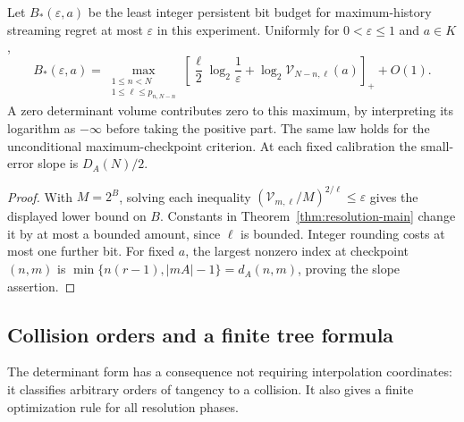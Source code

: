 \begin{corollary}\label{cor:intrinsic-bits}
Let $B_*(\varepsilon,a)$ be the least integer persistent bit budget
for maximum-history streaming regret at most $\varepsilon$ in this
experiment. Uniformly for $0<\varepsilon\le1$ and $a\in K$,
\begin{equation}\label{eq:intrinsic-bits}
 B_*(\varepsilon,a)=
 \max_{\substack{1\le n<N\\1\le\ell\le p_{n,N-n}}}
 \left[\frac{\ell}{2}\log_2\frac1\varepsilon+
       \log_2\mathcal V_{N-n,\ell}(a)\right]_++O(1).
\end{equation}
A zero determinant volume contributes zero to this maximum, by interpreting
its logarithm as $-\infty$ before taking the positive part. The same law
holds for the unconditional maximum-checkpoint criterion. At each fixed
calibration the small-error slope is $D_A(N)/2$.
\end{corollary}
\begin{proof}
With $M=2^B$, solving each inequality
$(\mathcal V_{m,\ell}/M)^{2/\ell}\le\varepsilon$ gives the displayed
lower bound on $B$. Constants in Theorem~\ref{thm:resolution-main} change
it by at most a bounded amount, since $\ell$ is bounded. Integer rounding
costs at most one further bit. For fixed $a$, the largest nonzero index
at checkpoint $(n,m)$ is
$\min\{n(r-1),|mA|-1\}=d_A(n,m)$, proving the slope assertion.
\end{proof}

\subsection{Collision orders and a finite tree formula}
The determinant form has a consequence not requiring interpolation
coordinates: it classifies arbitrary orders of tangency to a collision.
It also gives a finite optimization rule for all resolution phases.

